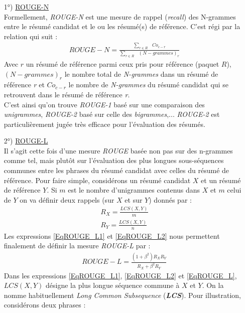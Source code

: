 \begin{itemize}
\item[1°)] \underline{ROUGE-N}\\
Formellement, \textit{ROUGE-N} est une mesure de rappel (\textit{recall}) des N-grammes entre le résumé candidat et le ou les résumé(s) de référence. C'est régi par la relation qui suit :
\begin{eqnarray}
ROUGE-N = \frac{\sum_{r\in R}\mbox{ }Co_{c-r}}{\sum_{r\in R}\mbox{ }(N-grammes)_{r}}
\end{eqnarray}
Avec $ r $ un résumé de référence parmi ceux pris pour référence (paquet $ R $), $ (N-grammes)_{r} $ le nombre total de \textit{N-grammes} dans un résumé de référence \textit{r} et $ Co_{c-r} $ le nombre de \textit{N-grammes} du résumé candidat qui se retrouvent dans le résumé de référence \textit{r}.\\
C'est ainsi qu'on trouve \textit{ROUGE-1} basé sur une comparaison des \textit{unigrammes}, \textit{ROUGE-2} basé sur celle des \textit{bigrammes},... \textit{ROUGE-2} est particulièrement jugée très efficace pour l'évaluation des résumés\cite{MaaliMnasri}.
\item[2°)] \underline{ROUGE-L}\\
Il s'agit cette fois d'une mesure \textit{ROUGE} basée non pas sur des n-grammes comme tel, mais plutôt sur l'évaluation des plus longues sous-séquences communes entre les phrases du résumé candidat avec celles du résumé de référence. Pour faire simple, considérons un résumé candidat $ X $ et un résumé de référence $ Y $. Si $ m $ est le nombre d'unigrammes contenus dans $ X $ et $ m $ celui de $ Y $ on va définir deux rappels (sur $ X $ et sur $ Y $) donnés par :
\begin{eqnarray}
R_{X} = \frac{LCS(X,Y)}{m} \label{EqROUGE_L1}\\
R_{Y} = \frac{LCS(X,Y)}{n} \label{EqROUGE_L2}
\end{eqnarray}
Les expressions \ref{EqROUGE_L1} et \ref{EqROUGE_L2} nous permettent finalement de définir la mesure \textit{ROUGE-L} par :
\begin{eqnarray}
ROUGE-L = \frac{(1+\beta^{2}) R_{X}R_{Y}}{R_{X}+\beta^{2}R_{Y}}\label{EqROUGE_L}
\end{eqnarray}
Dans les expressions \ref{EqROUGE_L1}, \ref{EqROUGE_L2} et \ref{EqROUGE_L}, $ LCS(X,Y) $ désigne la plus longue séquence commune à $ X $ et $ Y $. On la nomme habituellement \textit{Long Common Subsequence} (\textit{\textbf{LCS}}). Pour illustration, considérons deux phrases :
\begin{center}

\end{center}
\end{itemize}
